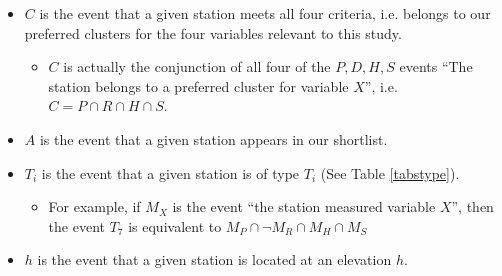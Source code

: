 \documentclass[12pt]{iopart}
\begin{document}
\begin{itemize}
\item $C$ is the event that a given station meets all four criteria, i.e. belongs to our preferred clusters for the four variables relevant to this study.
\begin{itemize}
\item $C$ is actually the conjunction of all four of the $P,D,H,S$ events ``The station belongs to a preferred cluster for variable $X$'', i.e. $C=P\cap R\cap H \cap S$.
\end{itemize}
\item $A$ is the event that a given station appears in our shortlist.
\item $T_i$ is the event that a given station is of type $T_i$ (See Table \ref{tabstype}).
\begin{itemize}
\item For example, if $M_X$ is the event ``the station measured variable $X$'', then the event $T_7$ is equivalent to $M_P\cap \neg M_R\cap M_H \cap M_S$
\end{itemize}
\item $h$ is the event that a given station is located at an elevation $h$.
\end{itemize}
\end{document}
